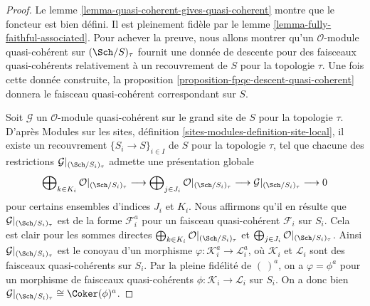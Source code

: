 \begin{proof}
Le lemme \ref{lemma-quasi-coherent-gives-quasi-coherent} montre que le
foncteur est bien défini. Il est pleinement fidèle par le lemme
\ref{lemma-fully-faithful-associated}. Pour achever la preuve, nous allons
montrer qu'un $\mathcal{O}$-module quasi-cohérent sur $(\Sch/S)_\tau$
fournit une donnée de descente pour des faisceaux quasi-cohérents
relativement à un recouvrement de $S$ pour la topologie $\tau$. Une fois
cette donnée
construite, la proposition \ref{proposition-fpqc-descent-quasi-coherent}
donnera le faisceau quasi-cohérent correspondant sur $S$.

\medskip\noindent
Soit $\mathcal{G}$ un $\mathcal{O}$-module quasi-cohérent sur le grand
site de $S$ pour la topologie $\tau$. D'après Modules sur les sites,
définition \ref{sites-modules-definition-site-local}, il existe un
recouvrement $\{S_i \to S\}_{i \in I}$ de $S$ pour la topologie $\tau$,
tel que chacune des restrictions
$\mathcal{G}|_{(\Sch/S_i)_\tau}$ admette une présentation globale
$$
\bigoplus\nolimits_{k \in K_i} \mathcal{O}|_{(\Sch/S_i)_\tau}
\longrightarrow
\bigoplus\nolimits_{j \in J_i} \mathcal{O}|_{(\Sch/S_i)_\tau}
\longrightarrow
\mathcal{G}|_{(\Sch/S_i)_\tau} \longrightarrow 0
$$
pour certains ensembles d'indices $J_i$ et $K_i$. Nous affirmons qu'il
en résulte que $\mathcal{G}|_{(\Sch/S_i)_\tau}$ est de la forme
$\mathcal{F}_i^a$ pour un faisceau quasi-cohérent $\mathcal{F}_i$ sur
$S_i$. Cela est clair
pour les sommes directes
$\bigoplus\nolimits_{k \in K_i} \mathcal{O}|_{(\Sch/S_i)_\tau}$ et
$\bigoplus\nolimits_{j \in J_i} \mathcal{O}|_{(\Sch/S_i)_\tau}$.
Ainsi $\mathcal{G}|_{(\Sch/S_i)_\tau}$ est le conoyau d'un morphisme
$\varphi : \mathcal{K}_i^a \to \mathcal{L}_i^a$, où
$\mathcal{K}_i$ et $\mathcal{L}_i$ sont des faisceaux quasi-cohérents
sur $S_i$. Par la pleine fidélité de $(\ )^a$, on a
$\varphi = \phi^a$ pour un morphisme de faisceaux quasi-cohérents
$\phi : \mathcal{K}_i \to \mathcal{L}_i$ sur $S_i$. On a donc bien
$\mathcal{G}|_{(\Sch/S_i)_\tau} \cong \Coker(\phi)^a$.


\end{proof}
